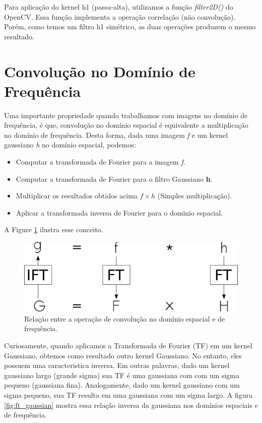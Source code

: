 \documentclass[10pt,twocolumn,letterpaper]{article}
\begin{document}
Para aplicação do kernel h1 (passa-alta), utilizamos a função \textit{filter2D()} do OpenCV. Essa função implementa a operação correlação (não convolução). Porém, como temos um filtro h1 simétrico, as duas operações produzem o mesmo resultado.

\section{Convolução no Domínio de Frequência}

Uma importante propriedade quando trabalhamos com imagens no domínio de frequência, é que, convolução no domínio espacial é equivalente a multiplicação no domínio de frequência.  Desta forma, dada uma imagem \textit{f} e um kernel gaussiano \textit{h} no domínio espacial, podemos:

\begin{itemize}
	\item Computar a transformada de Fourier para a imagem \textit{f}.
	\item Computar a transformada de Fourier para o filtro Gaussiano \textbf{h}.
	\item Multiplicar os resultados obtidos acima $f \times h$ (Simples multiplicação).
	\item Aplicar a transformada inversa de Fourier para o dominio espacial.
\end{itemize}

A Figure \ref{fig:conv_with_ft} ilustra esse conceito.

\begin{figure}[h!]
\begin{center}
	\includegraphics[width=0.99\columnwidth]{pics/ft}
	\caption{Relação entre a operação de convolução no domínio espacial e de frequência.\label{fig:conv_with_ft}}   
\end{center} 
\end{figure} 

Curiosamente, quando aplicamos a Transformada de Fourier (TF) em um kernel Gaussiano, obtemos como resultado outro kernel Gaussiano. No entanto, eles possuem uma caracteristica inversa. Em outras palavras, dado um kernel gaussiano largo (grande sigma) sua TF é uma gaussiana com com um sigma pequeno (gaussiana fina). Analogamente, dado um kernel gaussiano com um sigma pequeno, sua TF resulta em uma gaussiana com um sigma largo. A figura \ref{fig:ft_gaussian} mostra essa relação inversa da gaussiana nos domínios espaciais e de frequência.
\end{document}
